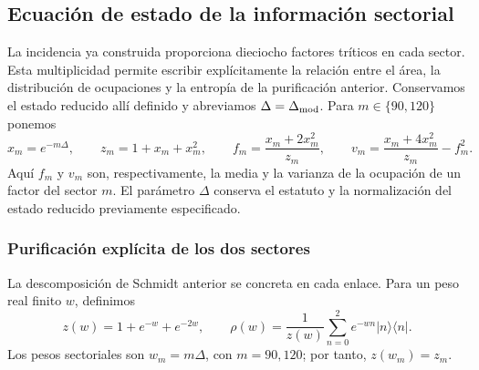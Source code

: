 \subsection{Ecuación de estado de la información sectorial}
\label{sec:ii-ecuacion-informacion}

La incidencia ya construida proporciona dieciocho factores tríticos en
cada sector. Esta multiplicidad permite escribir explícitamente la
relación entre el área, la distribución de ocupaciones y la entropía de
la purificación anterior. Conservamos el estado reducido allí definido
y abreviamos $\Delta=\Delta_{\rm mod}$. Para $m\in\{90,120\}$ ponemos
\begin{equation}
 x_m=e^{-m\Delta},\qquad z_m=1+x_m+x_m^2,\qquad
 f_m=\frac{x_m+2x_m^2}{z_m},\qquad
 v_m=\frac{x_m+4x_m^2}{z_m}-f_m^2.
 \label{eq:ii-sector-momentos}
\end{equation}
Aquí $f_m$ y $v_m$ son, respectivamente, la media y la varianza de
la ocupación de un factor del sector $m$. El parámetro $\Delta$ conserva
el estatuto y la normalización del estado reducido previamente
especificado.

\subsubsection{Purificación explícita de los dos sectores}
\label{sec:ii-area-purificacion-producto}

La descomposición de Schmidt anterior se concreta en cada enlace.
Para un peso real finito \(w\), definimos
\[
 z(w)=1+e^{-w}+e^{-2w},\qquad
 \rho(w)=\frac1{z(w)}\sum_{n=0}^2e^{-wn}|n\rangle\langle n|.
\]
Los pesos sectoriales son \(w_m=m\Delta\), con \(m=90,120\);
por tanto, \(z(w_m)=z_m\).

